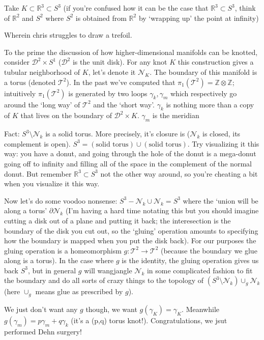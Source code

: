 \documentclass[11pt]{article}
\newcommand{\Z}{\mathbb{Z}}
\newcommand{\R}{\mathbb{R}}
\newcommand{\D}{\mathcal{D}}
\newcommand{\T}{\mathcal{T}}
\newcommand{\NN}{\mathcal{N}}
\theoremstyle{plain}
\theoremstyle{definition}
\begin{document}
Take $K \subset \R^3 \subset S^3$ (if you're confused how it can be the case that $\R^3 \subset S^3$, think of $\R^2$ and $S^2$ where $S^2$ is obtained from $\R^2$ by `wrapping up' the point at infinity)

Wherein chris struggles to draw a trefoil.

To the prime the discussion of how higher-dimensional manifolds can be knotted, consider $\D^2 \times S^1$ ($\D^2$ is the unit disk). For any knot $K$ this construction gives a tubular neighborhood of $K$, let's
denote it $\NN_K$.
The boundary of this manifold is a torus (denoted $\T^2$). In the past we've computed that $\pi_1(\T^2) = \Z \otimes \Z$; intuitively $\pi_1(\T^2)$ is generated by two loops $\gamma_k, \gamma_m$ which respectively
go around the `long way' of $\T^2$ and the `short way'. $\gamma_k$ is nothing more than a copy of $K$ that lives on the boundary of $\D^2 \times K$.
$\gamma_m$ is the meridian

Fact: $S^3 \setminus \NN_k$ is a solid torus. More precisely, it's closure is ($\NN_k$ is closed, its complement is open). $S^3 = (\text{solid torus}) \cup (\text{solid torus})$. Try visualizing it this way: you have
a donut, and going through the hole of the donut is a mega-donut going off to infinity and filling all of the space in the complement of the normal donut. But remember $\R^3 \subset S^3$ not the other way around, so you're cheating
a bit when you visualize it this way.

Now let's do some voodoo nonsense: $S^3 - \NN_k \cup \NN_k = S^3$ where the `union will be along a torus' $\partial \NN_k$ (I'm having a hard time notating this but you should imagine cutting a disk out of a plane
and putting it back; the interesection is the boundary of the disk you cut out, so the `gluing' operation amounts to specifying how the boundary is mapped when you put the disk back). For our purposes the gluing
operation is a homeomorphism $g: \T^2 \to \T^2$ (because the boundary we glue along is a torus). In the case where $g$ is the identity, the gluing operation gives us back $S^3$, but in general $g$ will wangjangle
$\NN_k$ in some complicated fashion to fit the boundary and do all sorts of crazy things to the topology of $(S^3 \setminus \NN_k) \cup_g \NN_k$ (here $\cup_g$ means glue as prescribed by $g$).

We just don't want any $g$ though, we want $g(\gamma_K) = \gamma_K$. Meanwhile $g(\gamma_m) = p \gamma_m + q \gamma_k$ (it's a (p,q) torus knot!). Congratulations, we jsut performed Dehn surgery!
\end{document}
